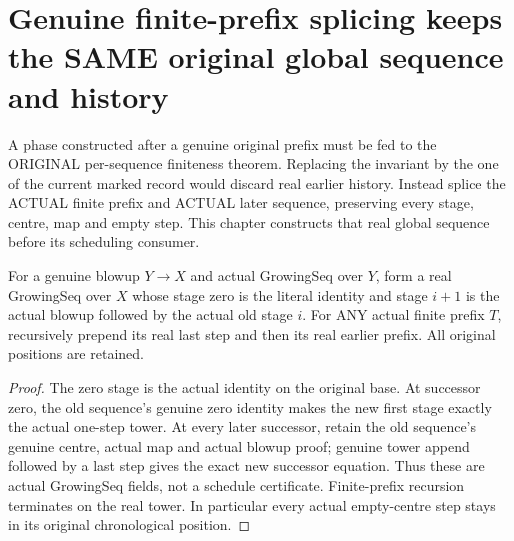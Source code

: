 \section{Genuine finite-prefix splicing keeps the SAME original global sequence and history}

A phase constructed after a genuine original prefix must be fed to the
ORIGINAL per-sequence finiteness theorem. Replacing the invariant by the one
of the current marked record would discard real earlier history. Instead
splice the ACTUAL finite prefix and ACTUAL later sequence, preserving every
stage, centre, map and empty step. This chapter constructs that real global
sequence before its scheduling consumer.

\begin{definition}
\label{hir:original-global-sequence-actual-prefix-splice}
\leanok
For a genuine blowup $Y\to X$ and actual GrowingSeq over $Y$, form a real
GrowingSeq over $X$ whose stage zero is the literal identity and stage
$i+1$ is the actual blowup followed by the actual old stage $i$.
For ANY actual finite prefix $T$, recursively prepend its real last step
and then its real earlier prefix. All original positions are retained.
\end{definition}
\begin{proof}
The zero stage is the actual identity on the original base. At successor
zero, the old sequence's genuine zero identity makes the new first stage
exactly the actual one-step tower. At every later successor, retain the old
sequence's genuine centre, actual map and actual blowup proof; genuine tower
append followed by a last step gives the exact new successor equation.
Thus these are actual GrowingSeq fields, not a schedule certificate.
Finite-prefix recursion terminates on the real tower. In particular every
actual empty-centre step stays in its original chronological position.
\end{proof}


